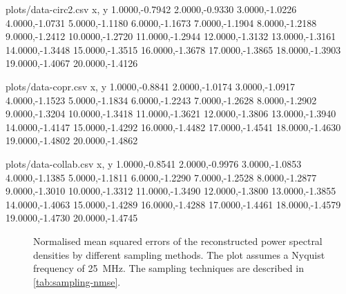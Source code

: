 \documentclass[a4paper, openany, oneside]{memoir}
\begin{document}
\begin{filecontents*}{plots/data-circ2.csv}
x, y
1.0000,-0.7942
2.0000,-0.9330
3.0000,-1.0226
4.0000,-1.0731
5.0000,-1.1180
6.0000,-1.1673
7.0000,-1.1904
8.0000,-1.2188
9.0000,-1.2412
10.0000,-1.2720
11.0000,-1.2944
12.0000,-1.3132
13.0000,-1.3161
14.0000,-1.3448
15.0000,-1.3515
16.0000,-1.3678
17.0000,-1.3865
18.0000,-1.3903
19.0000,-1.4067
20.0000,-1.4126
\end{filecontents*}

\begin{filecontents*}{plots/data-copr.csv}
x, y
1.0000,-0.8841
2.0000,-1.0174
3.0000,-1.0917
4.0000,-1.1523
5.0000,-1.1834
6.0000,-1.2243
7.0000,-1.2628
8.0000,-1.2902
9.0000,-1.3204
10.0000,-1.3418
11.0000,-1.3621
12.0000,-1.3806
13.0000,-1.3940
14.0000,-1.4147
15.0000,-1.4292
16.0000,-1.4482
17.0000,-1.4541
18.0000,-1.4630
19.0000,-1.4802
20.0000,-1.4862
\end{filecontents*}

\begin{filecontents*}{plots/data-collab.csv}
x, y
1.0000,-0.8541
2.0000,-0.9976
3.0000,-1.0853
4.0000,-1.1385
5.0000,-1.1811
6.0000,-1.2290
7.0000,-1.2528
8.0000,-1.2877
9.0000,-1.3010
10.0000,-1.3312
11.0000,-1.3490
12.0000,-1.3800
13.0000,-1.3855
14.0000,-1.4063
15.0000,-1.4289
16.0000,-1.4288
17.0000,-1.4461
18.0000,-1.4579
19.0000,-1.4730
20.0000,-1.4745
\end{filecontents*}

\begin{figure}
	\centering
	\caption{Normalised mean squared errors of the reconstructed power spectral densities by different sampling methods. The plot assumes a Nyquist frequency of \SI{25}{MHz}. The sampling techniques are described in \cref{tab:sampling-nmse}.}
	\label{fig:plot-nmse}
\end{figure}
\end{document}
